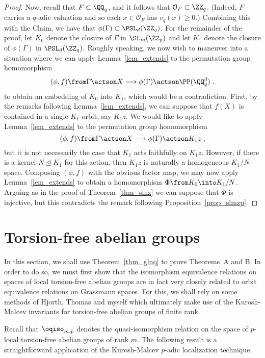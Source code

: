 \documentclass[oneside,leqno,11pt]{amsart}
\begin{document}
\begin{proof}
  Now, recall that $F\subset\QQ_q$, and it follows that $\mathcal
  O_F\subset\ZZ_q$.  (Indeed, $F$ carries a $q$-adic valuation and so
  each $x\in\mathcal O_F$ has $v_q(x)\geq0$.)  Combining this with the
  Claim, we have that $\phi(\Gamma)\subset\PSL_d(\ZZ_q)$.  For the
  remainder of the proof, let $K_0$ denote the closure of $\Gamma$ in
  $\SL_m(\ZZ_p)$ and let $K_1$ denote the closure of $\phi(\Gamma)$ in
  $\PSL_d(\ZZ_q)$.  Roughly speaking, we now wish to maneuver into a
  situation where we can apply Lemma~\ref{lem_extends} to the
  permutation group homomorphism
  \[(\phi,f)\from
  \Gamma\actson X\longrightarrow\phi(\Gamma)\actson\PP(\QQ_q^d)\;.
  \]
  to obtain an embedding of $K_0$ into $K_1$, which would be a
  contradiction.  First, by the remarks following
  Lemma~\ref{lem_extends}, we can suppose that $f(X)$ is contained in
  a single $K_1$-orbit, say $K_1z$.  We would like to apply
  Lemma~\ref{lem_extends} to the permutation group homomorphism
  \[(\phi,f)\from
  \Gamma\actson X\longrightarrow\phi(\Gamma)\actson K_1z\;,
  \]
  but it is not necessarily the case that $K_1$ acts faithfully on
  $K_1z$.  However, if there is a kernel $N\trianglelefteq K_1$ for
  this action, then $K_1z$ is naturally a homogeneous $K_1/N$-space.
  Composing $(\phi,f)$ with the obvious factor map, we may now apply
  Lemma~\ref{lem_extends} to obtain a homomorphism $\Phi\from K_0\into
  K_1/N$.  Arguing as in the proof of Theorem~\ref{thm_slnz} we can
  suppose that $\Phi$ is injective, but this contradicts the remark
  following Proposition~\ref{prop_slmzp}.
\end{proof}

\section{Torsion-free abelian groups}

In this section, we shall use Theorem~\ref{thm_glnq} to prove
Theorems~A and B.  In order to do so, we must first show that the
isomorphism equivalence relations on spaces of local torsion-free
abelian groups are in fact very closely related to orbit equivalence
relations on Grassmann spaces.  For this, we shall rely on some
methods of Hjorth, Thomas and myself which ultimately make use of the
Kurosh-Malcev invariants for torsion-free abelian groups of finite
rank.

Recall that $\oqiso_{m,p}$ denotes the quasi-isomorphism relation on
the space of $p$-local torsion-free abelian groups of rank $m$.  The
following result is a straightforward application of the Kurosh-Malcev
$p$-adic localization technique.
\end{document}
